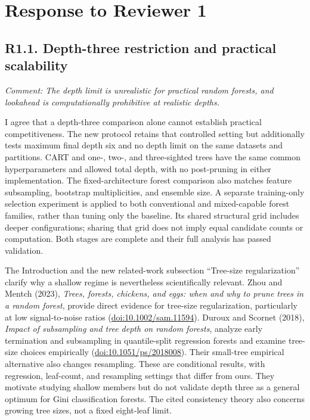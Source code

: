 \documentclass[11pt]{article}
\newcommand{\comment}[1]{\textit{Comment: #1}}
\begin{document}
\section*{Response to Reviewer 1}
\subsection*{R1.1. Depth-three restriction and practical scalability}
\comment{The depth limit is unrealistic for practical random forests, and lookahead is computationally prohibitive at realistic depths.}

I agree that a depth-three comparison alone cannot establish practical competitiveness. The new protocol retains that controlled setting but additionally tests maximum final depth six and no depth limit on the same datasets and partitions. CART and one-, two-, and three-sighted trees have the same common hyperparameters and allowed total depth, with no post-pruning in either implementation. The fixed-architecture forest comparison also matches feature subsampling, bootstrap multiplicities, and ensemble size. A separate training-only selection experiment is applied to both conventional and mixed-capable forest families, rather than tuning only the baseline. Its shared structural grid includes deeper configurations; sharing that grid does not imply equal candidate counts or computation. Both stages are complete and their full analysis has passed validation.

The Introduction and the new related-work subsection ``Tree-size regularization'' clarify why a shallow regime is nevertheless scientifically relevant. Zhou and Mentch (2023), \emph{Trees, forests, chickens, and eggs: when and why to prune trees in a random forest}, provide direct evidence for tree-size regularization, particularly at low signal-to-noise ratios (\href{https://doi.org/10.1002/sam.11594}{doi:10.1002/sam.11594}). Duroux and Scornet (2018), \emph{Impact of subsampling and tree depth on random forests}, analyze early termination and subsampling in quantile-split regression forests and examine tree-size choices empirically (\href{https://doi.org/10.1051/ps/2018008}{doi:10.1051/ps/2018008}). Their small-tree empirical alternative also changes resampling. These are conditional results, with regression, leaf-count, and resampling settings that differ from ours. They motivate studying shallow members but do not validate depth three as a general optimum for Gini classification forests. The cited consistency theory also concerns growing tree sizes, not a fixed eight-leaf limit.
\end{document}
